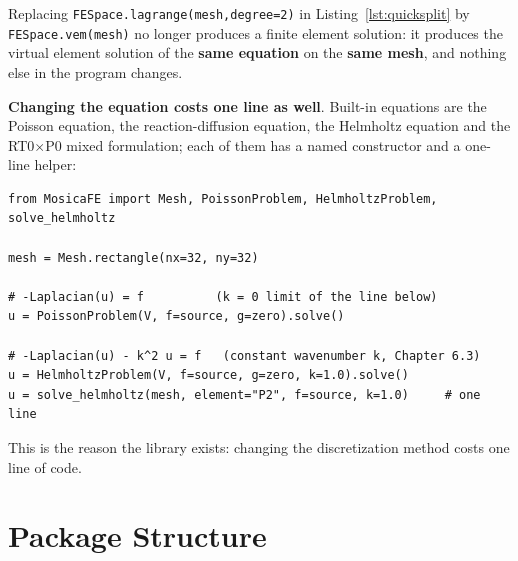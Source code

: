 \documentclass[11pt,oneside]{book}
\theoremstyle{definition}
\theoremstyle{plain}
\newenvironment{important}{%
  \begin{tcolorbox}[colback=blue!5,colframe=blue!45,title=Key Point,fonttitle=\bfseries]%
}{%
  \end{tcolorbox}%
}
\newcommand{\code}[1]{\texttt{#1}}
\begin{document}
Replacing \code{FESpace.lagrange(mesh,\allowbreak  degree=2)} in
Listing~\ref{lst:quicksplit} by \code{FESpace.vem(mesh)} no longer produces a finite
element solution: it produces the virtual element solution of the \textbf{same
equation} on the \textbf{same mesh}, and nothing else in the program changes.

\textbf{Changing the equation costs one line as well}. Built-in equations are the
Poisson equation, the reaction-diffusion equation, the Helmholtz equation and the
RT0$\times$P0 mixed formulation; each of them has a named constructor and a
one-line helper:

\begin{lstlisting}[language=MosicaFE,caption={Changing the equation},label={lst:quickswitch}]
from MosicaFE import Mesh, PoissonProblem, HelmholtzProblem, solve_helmholtz

mesh = Mesh.rectangle(nx=32, ny=32)

# -Laplacian(u) = f          (k = 0 limit of the line below)
u = PoissonProblem(V, f=source, g=zero).solve()

# -Laplacian(u) - k^2 u = f   (constant wavenumber k, Chapter 6.3)
u = HelmholtzProblem(V, f=source, g=zero, k=1.0).solve()
u = solve_helmholtz(mesh, element="P2", f=source, k=1.0)     # one line
\end{lstlisting}

\begin{important}
This is the reason the library exists: changing the discretization method costs one
line of code.
\end{important}

\section{Package Structure}
\label{sec:package-structure}
\end{document}
